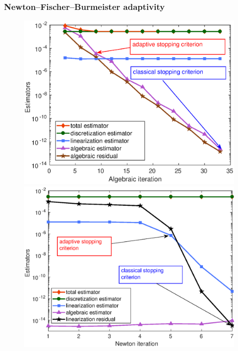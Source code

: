 \begin{frame}
\frametitle{Newton--Fischer--Burmeister adaptivity}
\textcolor{red}{}
\begin{figure}
\centering
\includegraphics[scale=0.43]{fig_article_chap_2/test_case_1_iter_11_estimator_gmres_1st_newton_iter}
\includegraphics[scale=0.43]{fig_article_chap_2/test_case_1_iter_11_estimator_newton_iter}
\end{figure}
\end{frame}

